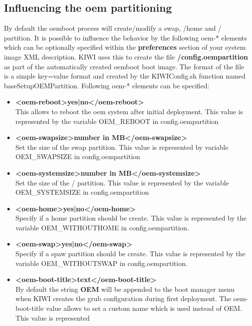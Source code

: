 \subsection{Influencing the oem partitioning}

By default the oemboot process will create/modify a swap, /home and /
partition. It is possible to influence the behavior by the following
oem-* elements which can be optionally specified within the
\textbf{preferences} section of your system image XML description.
KIWI uses this to create the file \textbf{/config.oempartition} as part
of the automatically created oemboot boot image. The format of the
file is a simple key=value format and created by the KIWIConfig.sh
function named baseSetupOEMPartition. Following oem-* elements can
be specified:

\begin{itemize}
\item \textbf{<oem-reboot>yes|no</oem-reboot>}\\
      This allows to reboot the oem system after initial deployment.
      This value is represented by the variable OEM\_REBOOT in
      config.oempartition
\item \textbf{<oem-swapsize>number in MB</oem-swapsize>}\\
      Set the size of the swap partition. This value is represented by
      variable OEM\_SWAPSIZE in config.oempartition
\item \textbf{<oem-systemsize>number in MB</oem-systemsize>}\\
      Set the size of the / partition. This value is represented by the
      variable OEM\_SYSTEMSIZE in config.oempartition
\item \textbf{<oem-home>yes|no</oem-home>}\\
      Specify if a home partition should be create. This value is represented
      by the variable OEM\_WITHOUTHOME in config.oempartition.
\item \textbf{<oem-swap>yes|no</oem-swap>}\\
      Specify if a spaw partition should be create. This value is represented 
      by the variable OEM\_WITHOUTSWAP in config.oempartition.
\item \textbf{<oem-boot-title>text</oem-boot-title>}\\
      By default the string \textbf{OEM} will be appended to the
      boot manager menu when KIWI creates the grub configuration during
      first deployment. The oem-boot-title value allows to set a custom
      name which is used instead of OEM. This value is represented

\end{itemize}
